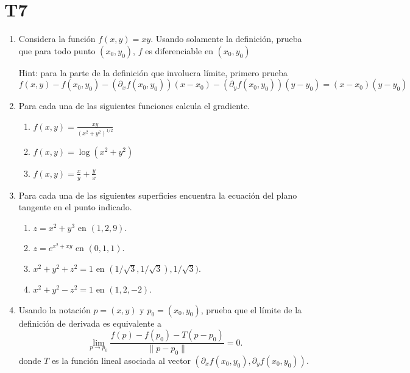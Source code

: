 \documentclass{article}
\theoremstyle{definition}
\begin{document}
\section*{T7}

\begin{enumerate}
\item Considera la funci\'on $f(x,y)=xy$. Usando solamente la definici\'on, prueba
  que para todo punto  $(x_0,y_0)$, $f$ es diferenciable en $(x_0,y_0)$



  Hint: para la parte de la definici\'on que involucra  l\'imite,
  primero prueba
        $$
        f(x,y)-f(x_0,y_0)- (\partial_xf(x_0,y_0))(x-x_0)-(\partial_yf(x_0,y_0))
        (y-y_0)= (x-x_0)(y-y_0)
        $$



      \item Para cada una de las siguientes funciones calcula el gradiente.
        \begin{enumerate}
        \item $f(x,y)=\frac{xy}{(x^2+y^2)^{1/2}}$
        \item $f(x,y)=\log(x^2+y^2)$
          \item $f(x,y)=\frac{x}{y}+\frac{y}{x}$
        \end{enumerate}


        
      \item Para cada una de las siguientes superficies encuentra la
        ecuaci\'on del plano tangente en el punto indicado.
        \begin{enumerate}
        \item $z=x^2+y^3$ en $(1,2,9)$.
        \item $z=e^{x^2+xy}$ en $(0,1,1)$.
        \item $x^2+y^2+z^2=1$ en $(1/\sqrt{3}, 1/\sqrt{3}), 1/\sqrt{3})$.
          \item $x^2+y^2-z^2=1$ en $(1,2,-2)$.
        \end{enumerate}


                
      \item Usando la notaci\'on  $p=(x,y)$ y  $p_0=(x_0,y_0)$, prueba que el
        l\'imite de la definici\'on de derivada  es equivalente a
        $$
        \lim_{p\to p_0}\frac{f(p)-f(p_0)-T(p-p_0) }{\|p-p_0\|}=0.
        $$
        donde $T$ es la funci\'on lineal asociada al vector
        $(\partial_xf(x_0,y_0), \partial_yf(x_0,y_0))$.



\end{enumerate}
\end{document}

